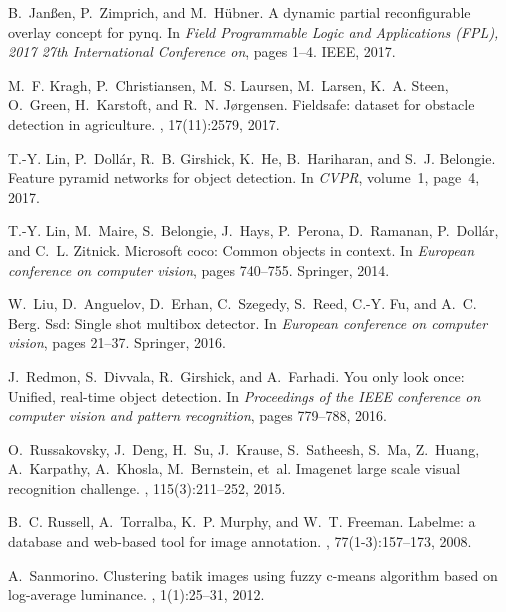\documentclass[10pt,journal,compsoc]{IEEEtran}
\begin{document}
\begin{thebibliography}{10}
B.~Jan{\ss}en, P.~Zimprich, and M.~H{\"u}bner.
\newblock A dynamic partial reconfigurable overlay concept for pynq.
\newblock In {\em Field Programmable Logic and Applications (FPL), 2017 27th
  International Conference on}, pages 1--4. IEEE, 2017.

M.~F. Kragh, P.~Christiansen, M.~S. Laursen, M.~Larsen, K.~A. Steen, O.~Green,
  H.~Karstoft, and R.~N. J{\o}rgensen.
\newblock Fieldsafe: dataset for obstacle detection in agriculture.
, 17(11):2579, 2017.

T.-Y. Lin, P.~Doll{\'a}r, R.~B. Girshick, K.~He, B.~Hariharan, and S.~J.
  Belongie.
\newblock Feature pyramid networks for object detection.
\newblock In {\em CVPR}, volume~1, page~4, 2017.

T.-Y. Lin, M.~Maire, S.~Belongie, J.~Hays, P.~Perona, D.~Ramanan,
  P.~Doll{\'a}r, and C.~L. Zitnick.
\newblock Microsoft coco: Common objects in context.
\newblock In {\em European conference on computer vision}, pages 740--755.
  Springer, 2014.

W.~Liu, D.~Anguelov, D.~Erhan, C.~Szegedy, S.~Reed, C.-Y. Fu, and A.~C. Berg.
\newblock Ssd: Single shot multibox detector.
\newblock In {\em European conference on computer vision}, pages 21--37.
  Springer, 2016.

J.~Redmon, S.~Divvala, R.~Girshick, and A.~Farhadi.
\newblock You only look once: Unified, real-time object detection.
\newblock In {\em Proceedings of the IEEE conference on computer vision and
  pattern recognition}, pages 779--788, 2016.

O.~Russakovsky, J.~Deng, H.~Su, J.~Krause, S.~Satheesh, S.~Ma, Z.~Huang,
  A.~Karpathy, A.~Khosla, M.~Bernstein, et~al.
\newblock Imagenet large scale visual recognition challenge.
, 115(3):211--252,
  2015.

B.~C. Russell, A.~Torralba, K.~P. Murphy, and W.~T. Freeman.
\newblock Labelme: a database and web-based tool for image annotation.
, 77(1-3):157--173,
  2008.

A.~Sanmorino.
\newblock Clustering batik images using fuzzy c-means algorithm based on
  log-average luminance.
,
  1(1):25--31, 2012.


\end{thebibliography}
\end{document}
